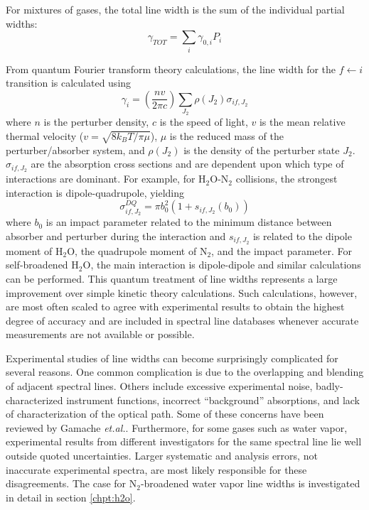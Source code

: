 \documentclass[11pt]{article}
\begin{document}
For mixtures of gases, the total line width is the sum of the individual
partial widths:
\begin{equation}
\gamma_{TOT}=\sum_i \gamma_{0,i}P_i
\end{equation}

From quantum Fourier transform theory calculations, the line width for the
$f\leftarrow i$ transition is calculated using \cite{gam:83}
\begin{equation}
\gamma_i = \left(\frac{n v}{2\pi c}\right)\sum_{J_2}\rho(J_2)\sigma_{if,J_2}
\end{equation}
where $n$ is the perturber density, $c$ is the speed of light, $v$ is the
mean relative thermal velocity ($v=\sqrt{8k_B T/\pi \mu}$), $\mu$ is the
reduced mass of the perturber/absorber system, and $\rho(J_2)$ is the
density of the perturber state $J_2$.  $\sigma_{if,J_2}$ are the absorption
cross sections and are dependent upon which type of interactions are
dominant.  For example, for H$_2$O-N$_2$ collisions, the strongest
interaction is dipole-quadrupole, yielding 
\begin{equation}
\sigma_{if, J_2}^{DQ}=\pi b_0^2 \left(1+s_{if,J_2}(b_0)\right)
\end{equation}
where $b_0$ is an impact parameter related to the minimum distance between 
absorber and perturber during the interaction and $s_{if,J_2}$ is related
to the dipole moment of H$_2$O, the quadrupole moment of N$_2$, and the
impact parameter.  For self-broadened H$_2$O, the main interaction is
dipole-dipole and similar calculations can be performed.  This quantum
treatment of line widths represents a large improvement over simple kinetic
theory calculations.  Such calculations, however, are most often scaled to 
agree with experimental results to obtain the highest degree of accuracy 
and are included in spectral line databases whenever accurate measurements 
are not available or possible.

Experimental studies of line widths can become surprisingly complicated for
several reasons.  One common complication is due to the overlapping and
blending of adjacent spectral lines.  Others include excessive experimental
noise, badly-characterized instrument functions, incorrect ``background'' 
absorptions, and lack of characterization of the optical path.  Some of 
these concerns have been reviewed by Gamache {\it et.al.}\cite{gam:94}.
Furthermore, for some gases such as water vapor, experimental results from 
different investigators for the same spectral line lie well outside quoted 
uncertainties.  Larger systematic and analysis errors, not inaccurate
experimental spectra, are most likely responsible for these disagreements.
The case for N$_2$-broadened water vapor line widths is investigated in
detail in section \ref{chpt:h2o}.
\end{document}
